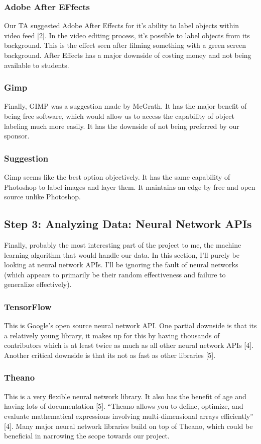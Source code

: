 \documentclass[10pt,journal,compsoc, draftclsnofoot,onecolumn]{IEEEtran}
\begin{document}
\subsubsection{Adobe After EFfects}
Our TA suggested Adobe After Effects for it's ability to label objects within video feed [2].
In the video editing process, it's possible to label objects from its background.
This is the effect seen after filming something with a green screen background.
After Effects has a major downside of costing money and not being available to students.

\subsubsection{Gimp}
Finally, GIMP was a suggestion made by McGrath.
It has the major benefit of being free software, which would allow us to access the capability of object labeling much more easily.
It has the downside of not being preferred by our sponsor.

\subsubsection{Suggestion}
Gimp seems like the best option objectively.
It has the same capability of Photoshop to label images and layer them.
It maintains an edge by free and open source unlike Photoshop.


\subsection{Step 3: Analyzing Data: Neural Network APIs}
Finally, probably the most interesting part of the project to me, the machine learning algorithm that would handle our data.
In this section, I'll purely be looking at neural network APIs.
I'll be ignoring the fault of neural networks (which appears to primarily be their random effectiveness and failure to generalize effectively). 

\subsubsection{TensorFlow}
This is Google's open source neural network API.
One partial downside is that its a relatively young library, it makes up for this by having thousands of contributors which is at least twice as much as all other neural network APIs [4].
Another critical downside is that its not as fast as other libraries [5].

\subsubsection{Theano}
This is a very flexible neural network library.
It also has the benefit of age and having lots of documentation [5].
“Theano allows you to define, optimize, and evaluate mathematical expressions involving multi-dimensional arrays efficiently” [4].
Many major neural network libraries build on top of Theano, which could be beneficial in narrowing the scope towards our project.
\end{document}
